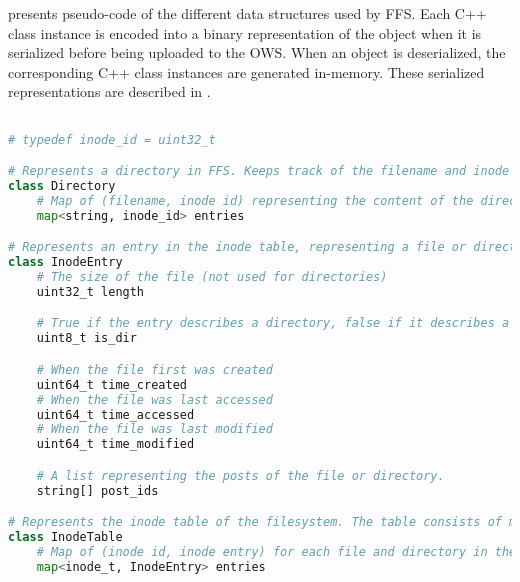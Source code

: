  presents \mbox{pseudo-code} of the different data structures used by \gls{FFS}. Each C++ class instance is encoded into a binary representation of the object when it is serialized before being uploaded to the \gls{OWS}. When an object is deserialized, the corresponding C++ class instances are generated \mbox{in-memory}. These serialized representations are described in .

\begin{lstlisting}[language=python, caption={Classes representing directories and the inode table in \gls{FFS}}, label=lst:dir_itable_classes,breaklines=true]

# typedef inode_id = uint32_t

# Represents a directory in FFS. Keeps track of the filename and inode of each file
class Directory
	# Map of (filename, inode id) representing the content of the directory
	map<string, inode_id> entries

# Represents an entry in the inode table, representing a file or directory
class InodeEntry
	# The size of the file (not used for directories) 
	uint32_t length

	# True if the entry describes a directory, false if it describes a file
	uint8_t is_dir

	# When the file first was created
	uint64_t time_created
	# When the file was last accessed
	uint64_t time_accessed
	# When the file was last modified
	uint64_t time_modified

	# A list representing the posts of the file or directory. 
	string[] post_ids

# Represents the inode table of the filesystem. The table consists of multiple inode entries
class InodeTable
	# Map of (inode id, inode entry) for each file and directory in the filesystem
	map<inode_t, InodeEntry> entries
\end{lstlisting}
